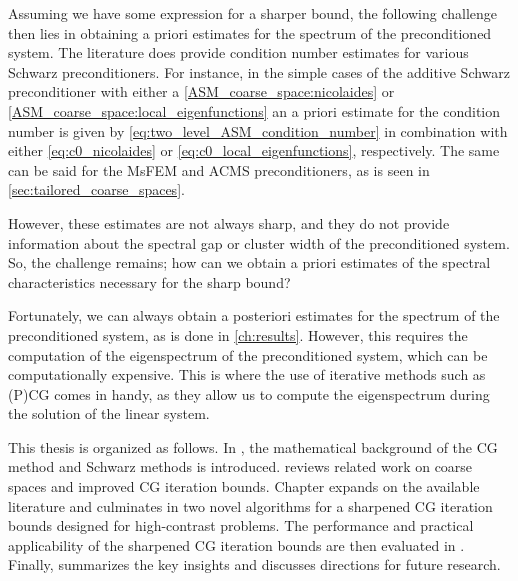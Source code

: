 Assuming we have some expression for a sharper bound, the following challenge then lies in obtaining a priori estimates for the spectrum of the preconditioned system. The literature does provide condition number estimates for various Schwarz preconditioners. For instance, in the simple cases of the additive Schwarz preconditioner with either a \ref{ASM_coarse_space:nicolaides} or \ref{ASM_coarse_space:local_eigenfunctions} an a priori estimate for the condition number is given by \cref{eq:two_level_ASM_condition_number} in combination with either \cref{eq:c0_nicolaides} or \cref{eq:c0_local_eigenfunctions}, respectively. The same can be said for the MsFEM and ACMS preconditioners, as is seen in \cref{sec:tailored_coarse_spaces}.

However, these estimates are not always sharp, and they do not provide information about the spectral gap or cluster width of the preconditioned system. So, the challenge remains; how can we obtain a priori estimates of the spectral characteristics necessary for the sharp bound?

Fortunately, we can always obtain a posteriori estimates for the spectrum of the preconditioned system, as is done in \cref{ch:results}. However, this requires the computation of the eigenspectrum of the preconditioned system, which can be computationally expensive. This is where the use of iterative methods such as (P)CG comes in handy, as they allow us to compute the eigenspectrum during the solution of the linear system.

This thesis is organized as follows. In , the mathematical background of the CG method and Schwarz methods is introduced.  reviews related work on coarse spaces and improved CG iteration bounds. Chapter  expands on the available literature and culminates in two novel algorithms for a sharpened CG iteration bounds designed for high-contrast problems. The performance and practical applicability of the sharpened CG iteration bounds are then evaluated in . Finally,  summarizes the key insights and discusses directions for future research.